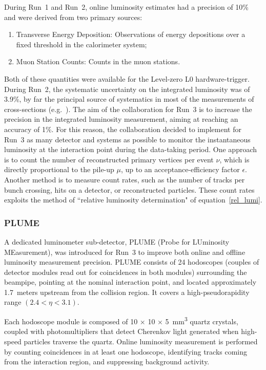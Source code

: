 During Run~1 and Run~2, online luminosity estimates had a precision of 10\% and were derived from two primary sources: 
\begin{enumerate}
    \item Transverse Energy Deposition: Observations of energy depositions over a fixed threshold in the calorimeter system;
    \item Muon Station Counts: Counts in the muon stations.
\end{enumerate}
Both of these quantities were available for the Level-zero L$0$ hardware-trigger.
During Run~2, the systematic uncertainty on the integrated luminosity was of 3.9\%, by far the principal source of systematics in most of the measurements of cross-sections (e.g.~\cite{j-psi}). The aim of the collaboration for Run~3 is to increase the precision in the integrated luminosity measurement, aiming at reaching an accuracy of 1\%\cite{Aaij:1951625}. For this reason, the collaboration decided to implement for Run~3 as many detector and systems as possible to monitor the instantaneous luminosity at the interaction point during the data-taking period.
One approach is to count the number of reconstructed primary vertices per event $\nu$, which is directly proportional to the pile-up $\mu$, up to an acceptance-efficiency factor $\epsilon$. Another method is to measure count rates, such as the number of tracks per bunch crossing, hits on a detector, or reconstructed particles. These count rates exploits the method of ``relative luminosity determination" of equation~\eqref{rel_lumi}.

\subsubsection{PLUME}
A dedicated luminometer sub-detector, PLUME (Probe for LUminosity MEasurement), was introduced for Run~3 to improve both online and offline luminosity measurement precision. PLUME consists of 24 hodoscopes (couples of detector modules read out for coincidences in both modules) surrounding the beampipe, pointing at the nominal interaction point, and located approximately 1.7~meters upstream from the collision region. It covers a high-pseudorapidity range $(2.4 < \eta < 3.1)$.

Each hodoscope module is composed of 10 × 10 × \SI{5}{\milli\meter\tothe{3}} quartz crystals, coupled with photomultipliers that detect Cherenkov light generated when high-speed particles traverse the quartz. Online luminosity measurement is performed by counting coincidences in at least one hodoscope, identifying tracks coming from the interaction region, and suppressing background activity.

